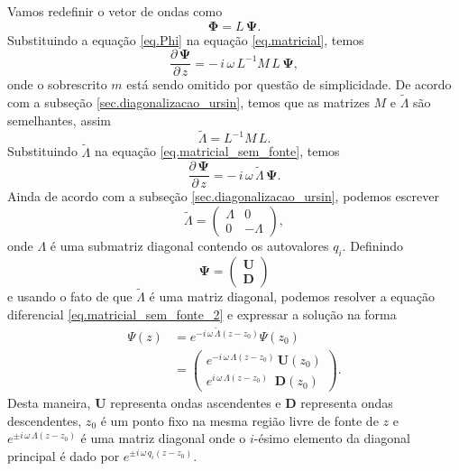 Vamos redefinir o vetor de ondas como
\begin{equation}\label{eq.Phi}
\mathbf{\Phi}=L\,\mathbf{\Psi}.
\end{equation}
Substituindo a equa\c{c}\~ao \ref{eq.Phi} na equa\c{c}\~ao \ref{eq.matricial}, temos
\begin{equation}\label{eq.matricial_sem_fonte}
\frac{\partial\,\mathbf{\Psi}}{\partial\,z} =-\,i\,\omega\,L^{-1}M\,L\,\mathbf{\Psi},
\end{equation}
onde o sobrescrito $m$ est\'a sendo omitido por quest\~ao de simplicidade.
De acordo com a subse\c{c}\~ao \ref{sec.diagonalizacao_ursin}, temos que as matrizes $M$ e $\tilde{\Lambda}$ s\~ao semelhantes, assim
\begin{equation*}
\tilde{\Lambda}=L^{-1}M\,L.
\end{equation*}
Substituindo $\tilde{\Lambda}$ na equa\c{c}\~ao \ref{eq.matricial_sem_fonte}, temos
\begin{equation}\label{eq.matricial_sem_fonte_2}
\frac{\partial\,\mathbf{\Psi}}{\partial\,z} =-\,i\,\omega\,\tilde{\Lambda}\,\mathbf{\Psi}.
\end{equation}
Ainda de acordo com a subse\c{c}\~ao \ref{sec.diagonalizacao_ursin}, podemos escrever
\begin{equation}
\tilde{\Lambda}=
\begin{pmatrix}
\Lambda&0\\
0&-\Lambda
\end{pmatrix},
\end{equation}
onde $\Lambda$ \'e uma submatriz diagonal contendo os autovalores $q_i$.
Definindo
\begin{equation}
\mathbf{\Psi}=
\begin{pmatrix}
\mathbf{U}\\
\mathbf{D}
\end{pmatrix}
\end{equation}
e usando o fato de que $\tilde{\Lambda}$ \'e uma matriz diagonal, podemos resolver a equa\c{c}\~ao diferencial \ref{eq.matricial_sem_fonte_2} e expressar a solu\c{c}\~ao na forma
\begin{align*}
\Psi(z)&=e^{-i\,\omega\,\tilde{\Lambda}(z-z_0)}\Psi(z_0)\\
&=\begin{pmatrix}
e^{-i\,\omega\,\Lambda(z-z_0)}\,\mathbf{U}(z_0)\\
e^{i\,\omega\,\Lambda(z-z_0)}\,\,\,\mathbf{D}(z_0)
\end{pmatrix}.
\end{align*}
Desta maneira, $\mathbf{U}$ representa ondas ascendentes e $\mathbf{D}$ representa ondas descendentes, $z_0$ \'e um ponto fixo na mesma regi\~ao livre de fonte de $z$ e $e^{\pm i\,\omega\,\Lambda(z-z_0)}$ \'e uma matriz diagonal onde o $i$-ésimo elemento da diagonal principal \'e dado por $e^{\pm i\,\omega\,q_i(z-z_0)}$. 


